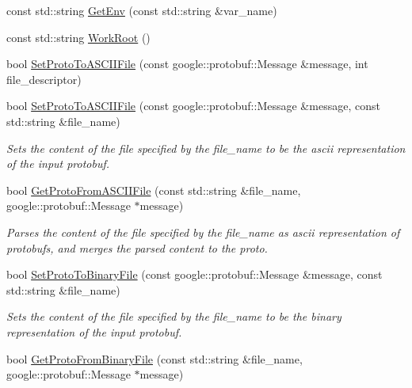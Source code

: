 \begin{DoxyCompactItemize}
\item 
const std\-::string \hyperlink{namespaceapollo_1_1cyber_1_1common_ac11a48ee837182876019fa8bd82138bd}{Get\-Env} (const std\-::string \&var\-\_\-name)
\item 
const std\-::string \hyperlink{namespaceapollo_1_1cyber_1_1common_ab1eeabd2bf7cd7ef2f34792af34196dd}{Work\-Root} ()
\item 
bool \hyperlink{namespaceapollo_1_1cyber_1_1common_a88247de6540a5a213e6f78f62ce60872}{Set\-Proto\-To\-A\-S\-C\-I\-I\-File} (const google\-::protobuf\-::\-Message \&message, int file\-\_\-descriptor)
\item 
bool \hyperlink{namespaceapollo_1_1cyber_1_1common_a0eb160d53ebe7c2f6b215f95081fb0ab}{Set\-Proto\-To\-A\-S\-C\-I\-I\-File} (const google\-::protobuf\-::\-Message \&message, const std\-::string \&file\-\_\-name)
\begin{DoxyCompactList}\small\item\em Sets the content of the file specified by the file\-\_\-name to be the ascii representation of the input protobuf. \end{DoxyCompactList}\item 
bool \hyperlink{namespaceapollo_1_1cyber_1_1common_a1d5f4e053ba687197ebdaf4eb7cf8aa1}{Get\-Proto\-From\-A\-S\-C\-I\-I\-File} (const std\-::string \&file\-\_\-name, google\-::protobuf\-::\-Message $\ast$message)
\begin{DoxyCompactList}\small\item\em Parses the content of the file specified by the file\-\_\-name as ascii representation of protobufs, and merges the parsed content to the proto. \end{DoxyCompactList}\item 
bool \hyperlink{namespaceapollo_1_1cyber_1_1common_a70ff11d21d9657f5d4b8be612cac79f0}{Set\-Proto\-To\-Binary\-File} (const google\-::protobuf\-::\-Message \&message, const std\-::string \&file\-\_\-name)
\begin{DoxyCompactList}\small\item\em Sets the content of the file specified by the file\-\_\-name to be the binary representation of the input protobuf. \end{DoxyCompactList}\item 
bool \hyperlink{namespaceapollo_1_1cyber_1_1common_ac40b1321abdcb5bee04ecc5a1754996e}{Get\-Proto\-From\-Binary\-File} (const std\-::string \&file\-\_\-name, google\-::protobuf\-::\-Message $\ast$message)

\end{DoxyCompactItemize}
